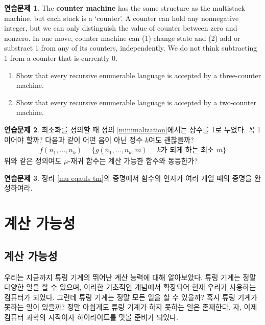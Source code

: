 \documentclass[b5paper, 11pt]{book}
\theoremstyle{definition}
\newtheorem{ec}{연습문제}[chapter]
\begin{document}
\begin{ec}
    The \textbf{counter machine} has the same structure as the multistack machine, 
    but each stack is a `counter'. A counter can hold any nonnegative integer, but 
    we can only distinguish the value of counter between zero and nonzero. In one
     move, counter machine can (1) change state and (2) add or substract 1 from any
      of its counters, independently. We do not think subtracting 1 from a counter 
      that is currently 0. 
      \begin{enumerate}
        \item Show that every recursive enumerable language is accepted by 
        a three-counter machine.
        \item Show that every recursive enumerable language is accepted by 
        a two-counter machine.
      \end{enumerate}
\end{ec}
\begin{ec}
    최소화를 정의할 때 정의 \ref{minimalization}에서는 상수를 1로 두었다. 꼭 1이어야 할까? 다음과 같이 어떤 음이 아닌 정수 $k$여도 괜찮을까?
    \begin{align*}
        f(n_1, \ldots, n_k) = \{g(n_1, \ldots, n_k, m) = k\text{가 되게 하는 최소 } m\}
    \end{align*}
    위와 같은 정의여도 $\mu$-재귀 함수는 계산 가능한 함수와 동등한가?
\end{ec}
\begin{ec}\label{several mu}
    정리 \ref{mu eqauls tm}의 증명에서 함수의 인자가 여러 개일 때의 증명을 완성하여라.
\end{ec}
\part{계산 가능성}
\chapter{계산 가능성}
우리는 지금까지 튜링 기계의 뛰어난 계산 능력에 대해 알아보았다. 튜링 기계는 정말 다양한 일을 할 수 있으며,
이러한 기초적인 개념에서 확장되어 현재 우리가 사용하는 컴퓨터가 되었다. 그런데 튜링 기계는 정말 모든 일을
할 수 있을까? 혹시 튜링 기계가 못하는 일이 있을까? 정말 아쉽게도 튜링 기계가 하지 못하는 일은 존재한다.
자, 이제 컴퓨터 과학의 시작이자 하이라이트를 맛볼 준비가 되었다.
\end{document}
